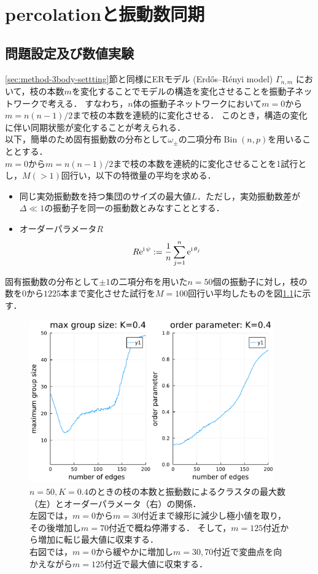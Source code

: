 \documentclass[../main]{subfiles}
\begin{document}
\chapter{percolationと振動数同期}
\label{chap:percolation}
\section{問題設定及び数値実験}
\ref{sec:method-3body-settting}節と同様にERモデル (Erd\H{o}s–R\'{e}nyi model) $\Gamma_{n,m}$ において，枝の本数$m$を変化することでモデルの構造を変化させることを振動子ネットワークで考える．
すなわち，$n$体の振動子ネットワークにおいて$m=0$から$m=n(n-1)/2$まで枝の本数を連続的に変化させる．
このとき，構造の変化に伴い同期状態が変化することが考えられる．\\
以下，簡単のため固有振動数の分布として$\omega_\pm$の二項分布$\operatorname{Bin}(n,p)$を用いることとする．\\
$m=0$から$m=n(n-1)/2$まで枝の本数を連続的に変化させることを1試行とし，$M(>1)$回行い，以下の特徴量の平均を求める．
\begin{itemize}
    \item 
    同じ実効振動数を持つ集団のサイズの最大値$L$．ただし，実効振動数差が$\Delta\ll 1$の振動子を同一の振動数とみなすこととする．
    \item
    オーダーパラメータ$R$
    \begin{align*}
        R\mathrm{e}^{{\mathrm i\,} \psi}:=\frac{1}{n}\sum_{j=1}^n\mathrm{e}^{{\mathrm i\,} \theta_j}    
    \end{align*}
\end{itemize}
固有振動数の分布として$\pm 1$の二項分布を用いた$n=50$個の振動子に対し，枝の数を$0$から$1225$本まで変化させた試行を$M=100$回行い平均したものを図\ref{fig:edge-strict400}に示す．
\begin{figure}[H]
\centering
\includegraphics[width=105mm]{images/edge-finite-strict400.pdf}
\centering
\caption{$n=50,K=0.4$のときの枝の本数と振動数によるクラスタの最大数（左）とオーダーパラメータ（右）の関係．\\
左図では，$m=0$から$m=30$付近まで線形に減少し極小値を取り，その後増加し$m=70$付近で概ね停滞する．
そして，$m=125$付近から増加に転じ最大値に収束する．\\
右図では，$m=0$から緩やかに増加し$m=30,70$付近で変曲点を向かえながら$m=125$付近で最大値に収束する．
}
\label{fig:edge-strict400}
\end{figure}
\end{document}
